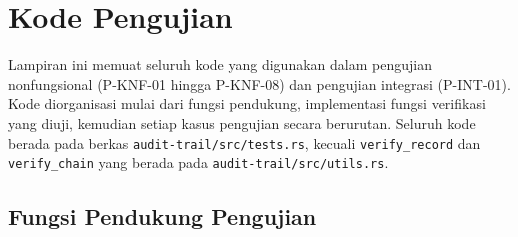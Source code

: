 
\chapter{Kode Pengujian}
\label{app:kode-pengujian}

Lampiran ini memuat seluruh kode yang digunakan dalam pengujian nonfungsional
(P-KNF-01 hingga P-KNF-08) dan pengujian integrasi (P-INT-01). Kode diorganisasi
mulai dari fungsi pendukung, implementasi fungsi verifikasi yang diuji, kemudian
setiap kasus pengujian secara berurutan. Seluruh kode berada pada berkas
\texttt{audit-trail/src/tests.rs}, kecuali \texttt{verify\_record} dan
\texttt{verify\_chain} yang berada pada \texttt{audit-trail/src/utils.rs}.

\section{Fungsi Pendukung Pengujian}

